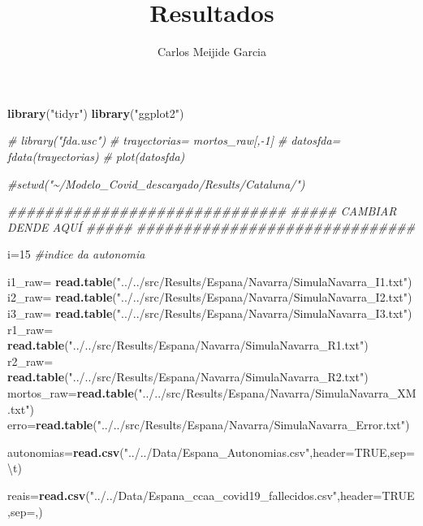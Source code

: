 \documentclass[
]{article}
\title{Resultados}
\author{Carlos Meijide Garcia}
\date{}
\newenvironment{Shaded}{\begin{snugshade}}{\end{snugshade}}
\newcommand{\CharTok}[1]{\textcolor[rgb]{0.31,0.60,0.02}{#1}}
\newcommand{\CommentTok}[1]{\textcolor[rgb]{0.56,0.35,0.01}{\textit{#1}}}
\newcommand{\DataTypeTok}[1]{\textcolor[rgb]{0.13,0.29,0.53}{#1}}
\newcommand{\DecValTok}[1]{\textcolor[rgb]{0.00,0.00,0.81}{#1}}
\newcommand{\KeywordTok}[1]{\textcolor[rgb]{0.13,0.29,0.53}{\textbf{#1}}}
\newcommand{\NormalTok}[1]{#1}
\newcommand{\OtherTok}[1]{\textcolor[rgb]{0.56,0.35,0.01}{#1}}
\newcommand{\StringTok}[1]{\textcolor[rgb]{0.31,0.60,0.02}{#1}}
\begin{document}
\maketitle

\begin{Shaded}
\begin{Highlighting}[]
\KeywordTok{library}\NormalTok{(}\StringTok{"tidyr"}\NormalTok{)}
\KeywordTok{library}\NormalTok{(}\StringTok{"ggplot2"}\NormalTok{)}

\CommentTok{\# library("fda.usc")}
\CommentTok{\# trayectorias= mortos\_raw[,{-}1]}
\CommentTok{\# datosfda= fdata(trayectorias)}
\CommentTok{\# plot(datosfda)}

\CommentTok{\#setwd("\textasciitilde{}/Modelo\_Covid\_descargado/Results/Cataluna/")}

\CommentTok{\#\#\#\#\#\#\#\#\#\#\#\#\#\#\#\#\#\#\#\#\#\#\#\#\#\#\#\#\#\#}
\CommentTok{\#\#\#\#\# CAMBIAR DENDE AQUÍ \#\#\#\#\#}
\CommentTok{\#\#\#\#\#\#\#\#\#\#\#\#\#\#\#\#\#\#\#\#\#\#\#\#\#\#\#\#\#\#}

\NormalTok{i=}\DecValTok{15} \CommentTok{\#indice da autonomia}

\NormalTok{i1\_raw=}\StringTok{ }\KeywordTok{read.table}\NormalTok{(}\StringTok{"../../src/Results/Espana/Navarra/SimulaNavarra\_I1.txt"}\NormalTok{)}
\NormalTok{i2\_raw=}\StringTok{ }\KeywordTok{read.table}\NormalTok{(}\StringTok{"../../src/Results/Espana/Navarra/SimulaNavarra\_I2.txt"}\NormalTok{)}
\NormalTok{i3\_raw=}\StringTok{ }\KeywordTok{read.table}\NormalTok{(}\StringTok{"../../src/Results/Espana/Navarra/SimulaNavarra\_I3.txt"}\NormalTok{)}
\NormalTok{r1\_raw=}\StringTok{ }\KeywordTok{read.table}\NormalTok{(}\StringTok{"../../src/Results/Espana/Navarra/SimulaNavarra\_R1.txt"}\NormalTok{)}
\NormalTok{r2\_raw=}\StringTok{ }\KeywordTok{read.table}\NormalTok{(}\StringTok{"../../src/Results/Espana/Navarra/SimulaNavarra\_R2.txt"}\NormalTok{)}
\NormalTok{mortos\_raw=}\KeywordTok{read.table}\NormalTok{(}\StringTok{"../../src/Results/Espana/Navarra/SimulaNavarra\_XM.txt"}\NormalTok{)}
\NormalTok{erro=}\KeywordTok{read.table}\NormalTok{(}\StringTok{"../../src/Results/Espana/Navarra/SimulaNavarra\_Error.txt"}\NormalTok{)}

\NormalTok{autonomias=}\KeywordTok{read.csv}\NormalTok{(}\StringTok{"../../Data/Espana\_Autonomias.csv"}\NormalTok{,}\DataTypeTok{header=}\OtherTok{TRUE}\NormalTok{,}\DataTypeTok{sep=}\StringTok{\textquotesingle{}}\CharTok{\textbackslash{}t}\StringTok{\textquotesingle{}}\NormalTok{)}

\NormalTok{reais=}\KeywordTok{read.csv}\NormalTok{(}\StringTok{"../../Data/Espana\_ccaa\_covid19\_fallecidos.csv"}\NormalTok{,}\DataTypeTok{header=}\OtherTok{TRUE}\NormalTok{,}\DataTypeTok{sep=}\StringTok{\textquotesingle{},\textquotesingle{}}\NormalTok{)}


\end{Highlighting}
\end{Shaded}
\end{document}
